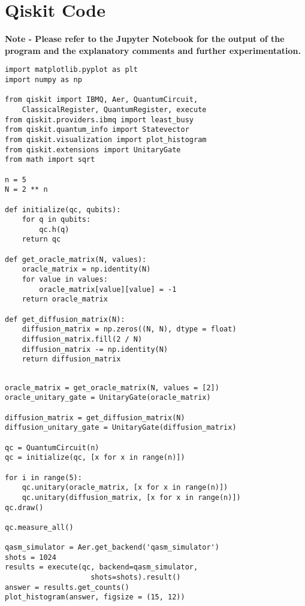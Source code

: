 \documentclass[13pt]{article}
\begin{document}
\section{Qiskit Code}
\textbf{Note - Please refer to the Jupyter Notebook for the output of the program and the explanatory comments and further experimentation.}

\begin{tcolorbox}[
    enhanced,
    attach boxed title to top left={xshift=6mm,yshift=-3mm},
    title=Simulation Code,
    boxed title style={size=small,sharp corners},
    sharp corners,
]
\begin{verbatim}
import matplotlib.pyplot as plt
import numpy as np

from qiskit import IBMQ, Aer, QuantumCircuit,
    ClassicalRegister, QuantumRegister, execute
from qiskit.providers.ibmq import least_busy
from qiskit.quantum_info import Statevector
from qiskit.visualization import plot_histogram
from qiskit.extensions import UnitaryGate
from math import sqrt

n = 5
N = 2 ** n

def initialize(qc, qubits):
    for q in qubits:
        qc.h(q)
    return qc

def get_oracle_matrix(N, values):
    oracle_matrix = np.identity(N)
    for value in values:
        oracle_matrix[value][value] = -1
    return oracle_matrix

def get_diffusion_matrix(N):
    diffusion_matrix = np.zeros((N, N), dtype = float)
    diffusion_matrix.fill(2 / N)
    diffusion_matrix -= np.identity(N)
    return diffusion_matrix

\end{verbatim}
\end{tcolorbox}
\begin{tcolorbox}[
    enhanced,
    attach boxed title to top left={xshift=6mm,yshift=-3mm},
    title=Simulation Code,
    boxed title style={size=small,sharp corners},
    sharp corners,
]
\begin{verbatim}

oracle_matrix = get_oracle_matrix(N, values = [2])
oracle_unitary_gate = UnitaryGate(oracle_matrix)

diffusion_matrix = get_diffusion_matrix(N)
diffusion_unitary_gate = UnitaryGate(diffusion_matrix)

qc = QuantumCircuit(n)
qc = initialize(qc, [x for x in range(n)])

for i in range(5):
    qc.unitary(oracle_matrix, [x for x in range(n)])
    qc.unitary(diffusion_matrix, [x for x in range(n)])
qc.draw()

qc.measure_all()

qasm_simulator = Aer.get_backend('qasm_simulator')
shots = 1024
results = execute(qc, backend=qasm_simulator,
                    shots=shots).result()
answer = results.get_counts()
plot_histogram(answer, figsize = (15, 12))
\end{verbatim}
\end{tcolorbox}
\end{document}

